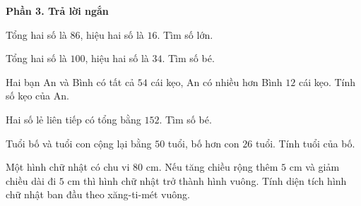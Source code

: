 \textbf{Phần 3. Trả lời ngắn}

\begin{ex} %
Tổng hai số là $86$, hiệu hai số là $16$. Tìm số lớn.
\end{ex}

\begin{ex} %
Tổng hai số là $100$, hiệu hai số là $34$. Tìm số bé.
\end{ex}

\begin{ex} %
Hai bạn An và Bình có tất cả $54$ cái kẹo, An có nhiều hơn Bình $12$ cái kẹo. Tính số kẹo của An.
\end{ex}

\begin{ex} %
Hai số lẻ liên tiếp có tổng bằng $152$. Tìm số bé.
\end{ex}

\begin{ex} %
Tuổi bố và tuổi con cộng lại bằng $50$ tuổi, bố hơn con $26$ tuổi. Tính tuổi của bố.
\end{ex}

\begin{ex} %
Một hình chữ nhật có chu vi $80\text{ cm}$. Nếu tăng chiều rộng thêm $5\text{ cm}$ và giảm chiều dài đi $5\text{ cm}$ thì hình chữ nhật trở thành hình vuông. Tính diện tích hình chữ nhật ban đầu theo xăng-ti-mét vuông.
\end{ex}
